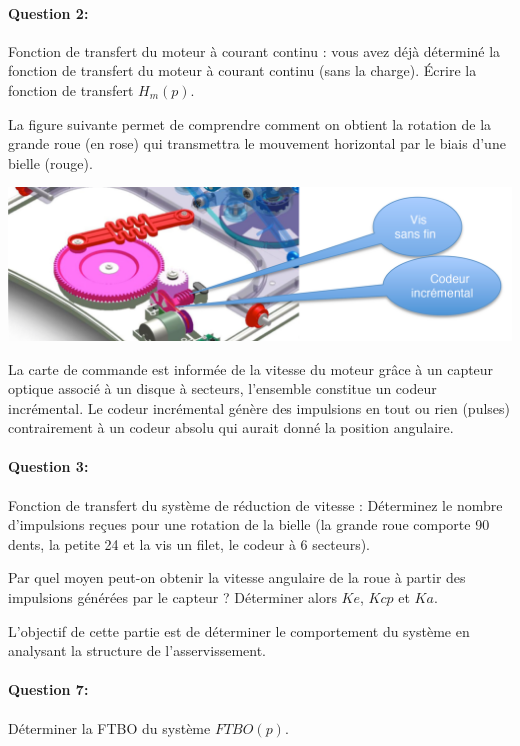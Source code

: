 \paragraph{Question 2:} Fonction de transfert du moteur à courant continu : vous avez déjà déterminé la fonction de transfert du moteur à courant continu (sans la charge). Écrire la fonction de transfert $H_m(p)$.

La figure suivante permet de comprendre comment on obtient la rotation de la grande roue (en rose) qui transmettra le mouvement horizontal par le biais d'une bielle (rouge).

\begin{center}
 \includegraphics[width=0.95\linewidth]{img/engrenages}
\end{center}

La carte de commande est informée de la vitesse du moteur grâce à un capteur optique associé à un disque à secteurs, l'ensemble constitue un codeur incrémental. Le codeur incrémental génère des impulsions en tout ou rien (pulses) contrairement à un codeur absolu qui aurait donné la position angulaire.

\paragraph{Question 3:} Fonction de transfert du système de réduction de vitesse : Déterminez le nombre d'impulsions reçues pour une rotation de la bielle (la grande roue comporte 90 dents, la petite 24 et la vis un filet, le codeur à 6 secteurs). 

Par quel moyen peut-on obtenir la vitesse angulaire de la roue à partir des impulsions générées par le capteur ? Déterminer
alors $Ke$, $Kcp$ et $Ka$.

\ifdef{\public}{\cleardoublepage}{}


L'objectif de cette partie est de déterminer le comportement du système en analysant la structure de l'asservissement.
~\

\paragraph{Question 7:} Déterminer la FTBO du système $FTBO(p)$.

